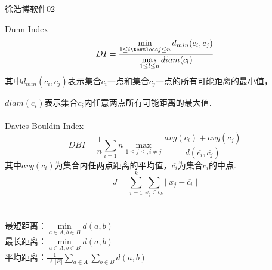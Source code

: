 \documentclass[UTF8]{ctexart}
\begin{document}
\renewcommand{\thefootnote}{\fnsymbol{footnote}}
\linespread{1.4}
\title{\vspace{-5em}\vspace{-2.5em}}
\date{}
\maketitle
\begin{center}
{\fangsong 徐浩博\quad 软件02}
\end{center}
Dunn Index $$DI=\frac{\min\limits_{1\leq i\textless j \leq n}d_{min}(c_i,c_j)}{\max\limits_{1\leq l \leq n }diam(c_l)}$$
其中$d_{min}(c_i,c_j)$表示集合$c_i$一点和集合$c_j$一点的所有可能距离的最小值，\par $diam(c_i)$表示集合$c_i$内任意两点所有可能距离的最大值.\\\\
\hspace{-2em}
Davies-Bouldin Index
$$DBI=\frac{1}{n}\sum\limits_{i=1}{n}\max\limits_{1\leq j\leq, i\neq j}\frac{avg(c_i)+avg(c_j)}{d(\overline{c_i},\overline{c_j})}$$
其中$avg(c_i)$为集合内任两点距离的平均值，$\overline{c_i}$为集合$c_i$的中点.
$$J=\sum\limits_{i=1}^{k}\sum\limits_{x_j\in c_k}||x_j-\overline{c_i}||$$\\
\\\hspace{-2em}
最短距离：$\min\limits_{a\in A, b\in B}d(a,b)$\\
最长距离：$\min\limits_{a\in A, b\in B}d(a,b)$\\
平均距离：$\frac{1}{|A||B|}\sum\limits_{a\in A}\sum\limits_{b\in B}d(a,b)$
\end{document}

